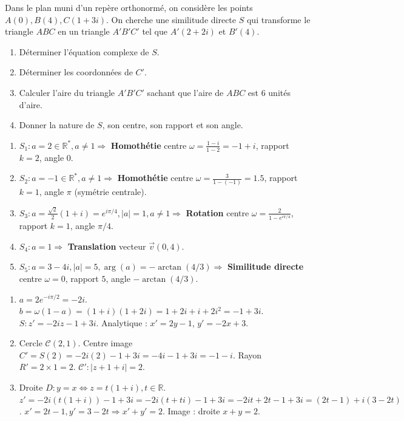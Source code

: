 \documentclass[11pt]{article}
\begin{document}
\begin{exercice}
Dans le plan muni d'un rep\`ere orthonorm\'e, on consid\`ere les points $A(0), B(4), C(1+3i)$.
On cherche une similitude directe $S$ qui transforme le triangle $ABC$ en un triangle $A'B'C'$ tel que $A'(2+2i)$ et $B'(4)$.
\begin{enumerate}
\item D\'eterminer l'\'equation complexe de $S$.
\item D\'eterminer les coordonn\'ees de $C'$.
\item Calculer l'aire du triangle $A'B'C'$ sachant que l'aire de $ABC$ est $6$ unit\'es d'aire.
\item Donner la nature de $S$, son centre, son rapport et son angle.
\end{enumerate}
\end{exercice}

\begin{corrige}
\begin{enumerate}
\item $S_1: a=2 \in \mathbb{R}^*, a\neq 1 \Rightarrow$ \textbf{Homoth\'etie} centre $\omega=\frac{1-i}{1-2}=-1+i$, rapport $k=2$, angle $0$.
\item $S_2: a=-1 \in \mathbb{R}^*, a\neq 1 \Rightarrow$ \textbf{Homoth\'etie} centre $\omega=\frac{3}{1-(-1)}=1.5$, rapport $k=1$, angle $\pi$ (sym\'etrie centrale).
\item $S_3: a=\frac{\sqrt{2}}{2}(1+i)=e^{i\pi/4}, |a|=1, a\neq 1 \Rightarrow$ \textbf{Rotation} centre $\omega=\frac{2}{1-e^{i\pi/4}}$, rapport $k=1$, angle $\pi/4$.
\item $S_4: a=1 \Rightarrow$ \textbf{Translation} vecteur $\vec{v}(0,4)$.
\item $S_5: a=3-4i, |a|=5, \arg(a)=-\arctan(4/3) \Rightarrow$ \textbf{Similitude directe} centre $\omega=0$, rapport $5$, angle $-\arctan(4/3)$.
\end{enumerate}
\end{corrige}

\begin{corrige}
\begin{enumerate}
\item $a = 2 e^{-i\pi/2} = -2i$. $b = \omega(1-a) = (1+i)(1+2i) = 1+2i+i+2i^2 = -1+3i$.
      $S: z' = -2i z -1+3i$.
      Analytique : $x' = 2y -1$, $y' = -2x + 3$.
\item Cercle $\mathcal{C}(2, 1)$. Centre image $C' = S(2) = -2i(2)-1+3i = -4i-1+3i = -1-i$. Rayon $R' = 2\times 1 = 2$.
      $\mathcal{C}' : |z+1+i| = 2$.
\item Droite $D: y=x \iff z = t(1+i), t\in\mathbb{R}$.
      $z' = -2i(t(1+i)) -1+3i = -2i(t+ti) -1+3i = -2it+2t -1+3i = (2t-1) + i(3-2t)$.
      $x' = 2t-1, y' = 3-2t \Rightarrow x'+y' = 2$. Image : droite $x+y=2$.
\end{enumerate}
\end{corrige}
\end{document}
